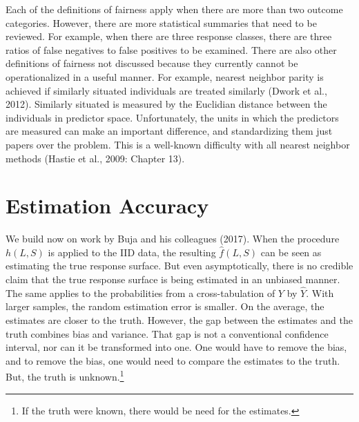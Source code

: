 \documentclass[12pt]{article}
\begin{document}
Each of the definitions of fairness apply when there are more than two outcome categories. However, there are more statistical summaries that need to be reviewed. For example, when there are three response classes, there are three ratios of false negatives to false positives to be examined. There are also other definitions of fairness not discussed because they currently cannot be operationalized in a useful manner. For example, nearest neighbor parity is achieved if similarly situated individuals are treated similarly (Dwork et al., 2012). Similarly situated is measured by the Euclidian distance between the individuals in predictor space. Unfortunately, the units in which the predictors are measured can make an important difference, and standardizing them just papers over the problem. This is a well-known difficulty with all nearest neighbor methods (Hastie et al., 2009: Chapter 13).

\section{Estimation Accuracy}

We build now on work by Buja and his colleagues (2017). When the procedure $h(L,S)$ is applied to the IID data, the resulting $\hat{f}(L,S)$ can be seen as estimating the true response surface. But even asymptotically, there is no credible claim that the true response surface is being estimated in an unbiased manner. The same applies to the probabilities from a cross-tabulation of $Y$ by $\hat{Y}$. With larger samples, the random estimation error is smaller. On the average, the estimates are closer to the truth. However, the gap between the estimates and the truth combines bias and variance. That gap is not a conventional confidence interval, nor can it be transformed into one. One would have to remove the bias, and to remove the bias, one would need to compare the estimates to the truth. But, the truth is unknown.\footnote
{
If the truth were known, there would be need for the estimates.
}
\end{document}
